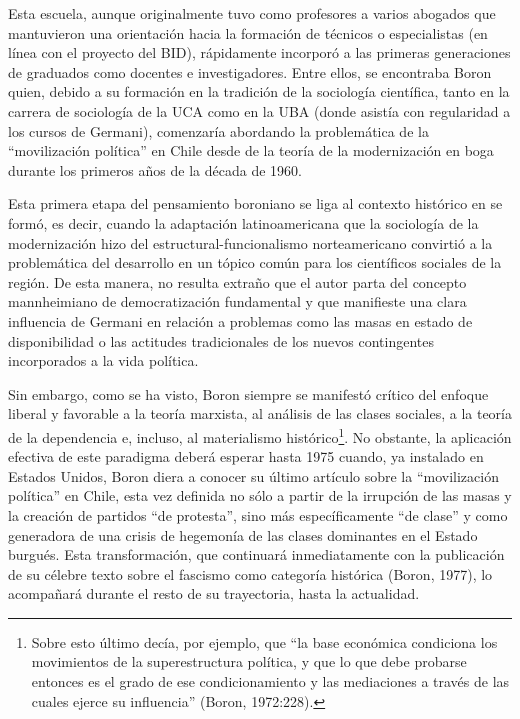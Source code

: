 Esta escuela, aunque originalmente tuvo como profesores a varios abogados que mantuvieron una orientación hacia la formación de técnicos o especialistas (en línea con el proyecto del BID), rápidamente incorporó a las primeras generaciones de graduados como docentes e investigadores. Entre ellos, se encontraba Boron quien, debido a su formación en la tradición de la sociología científica, tanto en la carrera de sociología de la UCA como en la UBA (donde asistía con regularidad a los cursos de Germani), comenzaría abordando la problemática de la ``movilización política'' en Chile desde de la teoría de la modernización en boga durante los primeros años de la década de 1960.

Esta primera etapa del pensamiento boroniano se liga al contexto histórico en se formó, es decir, cuando la adaptación latinoamericana que la sociología de la modernización hizo del estructural-funcionalismo norteamericano convirtió a la problemática del desarrollo en un tópico común para los científicos sociales de la región. De esta manera, no resulta extraño que el autor parta del concepto mannheimiano de democratización fundamental y que manifieste una clara influencia de Germani en relación a problemas como las masas en estado de disponibilidad o las actitudes tradicionales de los nuevos contingentes incorporados a la vida política.

Sin embargo, como se ha visto, Boron siempre se manifestó crítico del enfoque liberal y favorable a la teoría marxista, al análisis de las clases sociales, a la teoría de la dependencia e, incluso, al materialismo histórico\footnote{Sobre esto último decía, por ejemplo, que ``la base económica condiciona los movimientos de la superestructura política, y que lo que debe probarse entonces es el grado de ese condicionamiento y las mediaciones a través de las cuales ejerce su influencia'' (Boron, 1972:228).}. No obstante, la aplicación efectiva de este paradigma deberá esperar hasta 1975 cuando, ya instalado en Estados Unidos, Boron diera a conocer su último artículo sobre la ``movilización política'' en Chile, esta vez definida no sólo a partir de la irrupción de las masas y la creación de partidos ``de protesta'', sino más específicamente ``de clase'' y como generadora de una crisis de hegemonía de las clases dominantes en el Estado burgués. Esta transformación, que continuará inmediatamente con la publicación de su célebre texto sobre el fascismo como categoría histórica (Boron, 1977), lo acompañará durante el resto de su trayectoria, hasta la actualidad.

